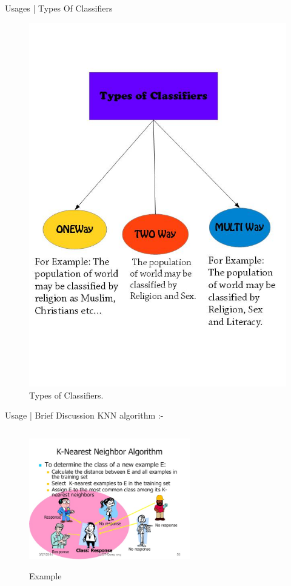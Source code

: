 \documentclass[10pt]{beamer}
\begin{document}
\begin{frame}{Usages | Types Of Classifiers}
		\begin{figure}
				\centering
				\includegraphics[scale=0.218]{images/barun_5}
				\caption[]{Types of Classifiers.}
			\end{figure}
		
	\end{frame}
	\begin{frame}{Usage | Brief Discussion}
		\large{KNN algorithm :-}
		\begin{figure}
			\centering
			\includegraphics[width=70mm,height=60mm]{images/barun_3}
			\caption[]{Example}
		\end{figure}
	\end{frame}
\end{document}
